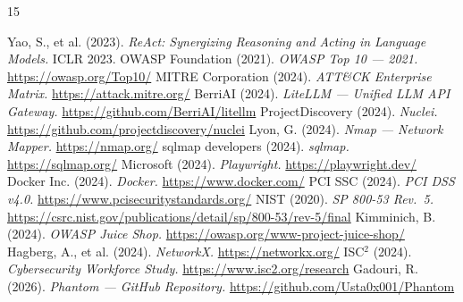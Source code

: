 \documentclass[12pt,a4paper]{report}
\begin{document}
\begin{thebibliography}{15}

 Yao, S., et al. (2023). \textit{ReAct: Synergizing Reasoning and Acting in Language Models.} ICLR 2023.
 OWASP Foundation (2021). \textit{OWASP Top 10 --- 2021.} \url{https://owasp.org/Top10/}
 MITRE Corporation (2024). \textit{ATT\&CK Enterprise Matrix.} \url{https://attack.mitre.org/}
 BerriAI (2024). \textit{LiteLLM --- Unified LLM API Gateway.} \url{https://github.com/BerriAI/litellm}
 ProjectDiscovery (2024). \textit{Nuclei.} \url{https://github.com/projectdiscovery/nuclei}
 Lyon, G. (2024). \textit{Nmap --- Network Mapper.} \url{https://nmap.org/}
 sqlmap developers (2024). \textit{sqlmap.} \url{https://sqlmap.org/}
 Microsoft (2024). \textit{Playwright.} \url{https://playwright.dev/}
 Docker Inc. (2024). \textit{Docker.} \url{https://www.docker.com/}
 PCI SSC (2024). \textit{PCI DSS v4.0.} \url{https://www.pcisecuritystandards.org/}
 NIST (2020). \textit{SP 800-53 Rev.\ 5.} \url{https://csrc.nist.gov/publications/detail/sp/800-53/rev-5/final}
 Kimminich, B. (2024). \textit{OWASP Juice Shop.} \url{https://owasp.org/www-project-juice-shop/}
 Hagberg, A., et al. (2024). \textit{NetworkX.} \url{https://networkx.org/}
 ISC$^2$ (2024). \textit{Cybersecurity Workforce Study.} \url{https://www.isc2.org/research}
 Gadouri, R. (2026). \textit{Phantom --- GitHub Repository.} \url{https://github.com/Usta0x001/Phantom}

\end{thebibliography}
\end{document}
